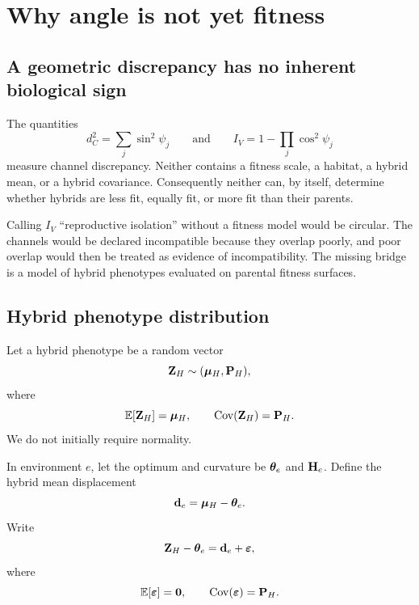 \chapter{Why angle is not yet fitness}

\section{A geometric discrepancy has no inherent biological sign}

The quantities
\begin{equation}
d_C^2=\sum_j\sin^2\psi_j
\qquad\text{and}\qquad
I_V=1-\prod_j\cos^2\psi_j
\end{equation}
measure channel discrepancy. Neither contains a fitness scale, a habitat, a hybrid mean, or a hybrid covariance. Consequently neither can, by itself, determine whether hybrids are less fit, equally fit, or more fit than their parents.

\begin{cautionbox}
Calling \(I_V\) ``reproductive isolation'' without a fitness model would be circular. The channels would be declared incompatible because they overlap poorly, and poor overlap would then be treated as evidence of incompatibility. The missing bridge is a model of hybrid phenotypes evaluated on parental fitness surfaces.
\end{cautionbox}

\section{Hybrid phenotype distribution}

Let a hybrid phenotype be a random vector
\begin{equation}
\mathbf Z_H\sim(\boldsymbol{\mu}_H,\mathbf{P}_H),
\end{equation}
where
\begin{equation}
\mathbb E[\mathbf Z_H]=\boldsymbol{\mu}_H,
\qquad
\operatorname{Cov}(\mathbf Z_H)=\mathbf{P}_H.
\end{equation}
We do not initially require normality.

In environment \(e\), let the optimum and curvature be \(\boldsymbol{\theta}_e\) and \(\mathbf{H}_e\). Define the hybrid mean displacement
\begin{equation}
\mathbf d_e=\boldsymbol{\mu}_H-\boldsymbol{\theta}_e.
\end{equation}
Write
\begin{equation}
\mathbf Z_H-\boldsymbol{\theta}_e
=\mathbf d_e+\boldsymbol\varepsilon,
\end{equation}
where
\begin{equation}
\mathbb E[\boldsymbol\varepsilon]=\mathbf{0},
\qquad
\operatorname{Cov}(\boldsymbol\varepsilon)=\mathbf{P}_H.
\end{equation}

